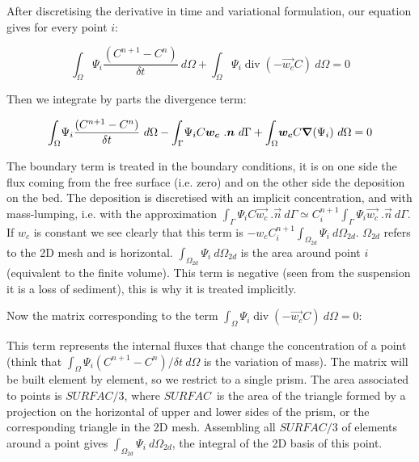 After discretising the derivative in time and variational formulation, our
equation gives for every point $i$:%

\begin{equation}%
{\displaystyle\int\nolimits_{\Omega}}
\Psi_{i}\dfrac{(C^{n+1}-C^{n})}{\delta t}~d\Omega+%
{\displaystyle\int\nolimits_{\Omega}}
\Psi_{i}\operatorname{div}(-\vec{w_{c}}C)~d\Omega=0
\end{equation}


Then we integrate by parts the divergence term:%

\begin{equation}%
{\displaystyle\int\nolimits_{\Omega}}
\Psi_{i}\dfrac{(C^{n+1}-C^{n})}{\delta t}~d\Omega-%
{\displaystyle\int\nolimits_{\Gamma}}
\Psi_{i}C\vec{w_{c}}~.\vec{n}~d\Gamma+%
{\displaystyle\int\nolimits_{\Omega}}
\vec{w_{c}}C\Grad(\Psi_{i}%
)~d\Omega=0
\end{equation}


The boundary term is treated in the boundary conditions, it is on one side the
flux coming from the free surface (i.e. zero) and on the other side the
deposition on the bed. The deposition is discretised with an implicit
concentration, and with mass-lumping, i.e. with the approximation
${\displaystyle\int\nolimits_{\Gamma}}
\Psi_{i}C\vec{w_{c}}~.\vec{n}~d\Gamma\simeq C_{i}^{n+1}%
{\displaystyle\int\nolimits_{\Gamma}}
\Psi_{i}\vec{w_{c}}~.\vec{n}~d\Gamma$. If $w_{c}$ is
constant we see clearly that this term is $-w_{c}C_{i}^{n+1}
{\displaystyle\int\nolimits_{\Omega_{2d}}}
\Psi_{i}~d\Omega_{2d}$. $\Omega_{2d}$ refers to the 2D mesh and is horizontal.
${\displaystyle\int\nolimits_{\Omega_{2d}}}\Psi_{i}~d\Omega_{2d}$
is the area around point $i$ (equivalent to the finite
volume). This term is negative (seen from the suspension it is a loss of
sediment), this is why it is treated implicitly.

Now the matrix corresponding to the term ${\displaystyle\int\nolimits_{\Omega}}
\Psi_{i}\operatorname{div}(-\vec{w_{c}}C)~d\Omega=0$:

This term represents the internal fluxes that change the concentration of a
point (think that ${\int_{\Omega}}\Psi_{i}(C^{n+1}-C^{n})/\delta t~d\Omega$ is the variation of mass).
The matrix will be built element by element, so we restrict to a single prism.
The area associated to points is $SURFAC/3$, where $SURFAC$\ is the area of
the triangle formed by a projection on the horizontal of upper and lower sides
of the prism, or the corresponding triangle in the 2D mesh. Assembling all
$SURFAC/3$ of elements around a point gives ${\displaystyle\int
\nolimits_{\Omega_{2d}}}\Psi_{i}~d\Omega_{2d}$,
the integral of the 2D basis of this point.%

